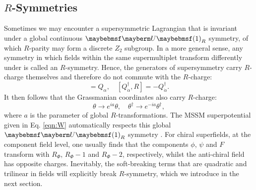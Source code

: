\subsection{$R$-Symmetries}

Sometimes we may encounter a supersymmetric Lagrangian that is invariant under a global continuous $\Ugroup{1}_R$ symmetry, of which $R$-parity may form a discrete $Z_2$ subgroup. In a more general sense, any symmetry in which fields within the same supermultiplet transform differently under is called an $R$-symmetry.  Hence, the generators of supersymmetry carry $R$-charge themselves and therefore do not commute with the $R$-charge:
\begin{equation}
	[Q_{\alpha},R]=Q_{\alpha},\quad [Q^{\dagger}_{\dot{\alpha}},R]=-Q^{\dagger}_{\dot{\alpha}}.
\end{equation}
It then follows that the Grassmanian coordinates also carry $R$-charge:
\begin{equation}
	\theta \rightarrow e^{ia}\theta, \quad \theta^{\dagger} \rightarrow e^{-ia}\theta^{\dagger},
\end{equation}
where $a$ is the parameter of global $R$-transformations. The MSSM superpotential given in Eq. \ref{eqn:W} automatically respects this global $\Ugroup{1}_R$ symmetry \cite{RN804,RN805}. For chiral superfields, at the component field level, one usually finds that the components $\phi$, $\psi$ and $F$ transform with $R_{\Phi}$, $R_{\Phi}-1$ and $R_{\Phi}-2$, respectively, whilst the anti-chiral field has opposite charges. Inevitably, the soft-breaking terms that are quadratic and trilinear in fields will explicitly break $R$-symmetry, which we introduce in the next section.

